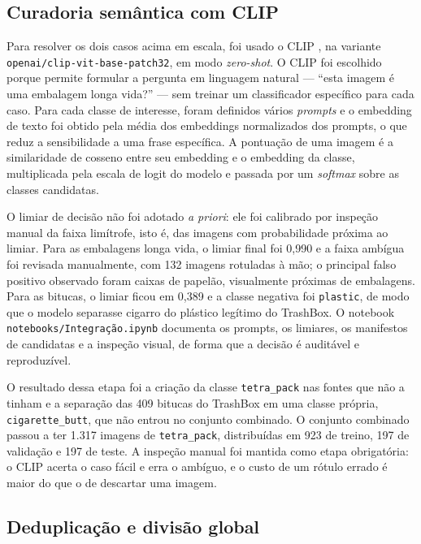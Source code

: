 \documentclass[11pt,a4paper]{article}
\begin{document}
	\subsection{Curadoria semântica com CLIP}
	
	Para resolver os dois casos acima em escala, foi usado o CLIP \cite{radford2021}, na variante \texttt{openai/clip-vit-base-patch32}, em modo \textit{zero-shot}. O CLIP foi escolhido porque permite formular a pergunta em linguagem natural --- ``esta imagem é uma embalagem longa vida?'' --- sem treinar um classificador específico para cada caso. Para cada classe de interesse, foram definidos vários \emph{prompts} e o embedding de texto foi obtido pela média dos embeddings normalizados dos prompts, o que reduz a sensibilidade a uma frase específica. A pontuação de uma imagem é a similaridade de cosseno entre seu embedding e o embedding da classe, multiplicada pela escala de logit do modelo e passada por um \emph{softmax} sobre as classes candidatas.
	
	O limiar de decisão não foi adotado \emph{a priori}: ele foi calibrado por inspeção manual da faixa limítrofe, isto é, das imagens com probabilidade próxima ao limiar. Para as embalagens longa vida, o limiar final foi 0,990 e a faixa ambígua foi revisada manualmente, com 132 imagens rotuladas à mão; o principal falso positivo observado foram caixas de papelão, visualmente próximas de embalagens. Para as bitucas, o limiar ficou em 0,389 e a classe negativa foi \texttt{plastic}, de modo que o modelo separasse cigarro do plástico legítimo do TrashBox. O notebook \texttt{notebooks/Integração.ipynb} documenta os prompts, os limiares, os manifestos de candidatas e a inspeção visual, de forma que a decisão é auditável e reproduzível.
	
	O resultado dessa etapa foi a criação da classe \texttt{tetra\_pack} nas fontes que não a tinham e a separação das 409 bitucas do TrashBox em uma classe própria, \texttt{cigarette\_butt}, que não entrou no conjunto combinado. O conjunto combinado passou a ter 1.317 imagens de \texttt{tetra\_pack}, distribuídas em 923 de treino, 197 de validação e 197 de teste. A inspeção manual foi mantida como etapa obrigatória: o CLIP acerta o caso fácil e erra o ambíguo, e o custo de um rótulo errado é maior do que o de descartar uma imagem.
	
	\subsection{Deduplicação e divisão global}
	
\end{document}
